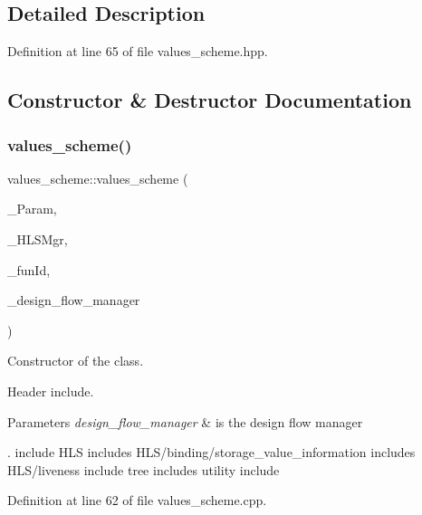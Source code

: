 \subsection{Detailed Description}


Definition at line 65 of file values\+\_\+scheme.\+hpp.



\subsection{Constructor \& Destructor Documentation}
\mbox{\label{classvalues__scheme_a056d10ea16901129e0a1a722b462b578}} 
\subsubsection{\texorpdfstring{values\+\_\+scheme()}{values\_scheme()}}
{\footnotesize\ttfamily values\+\_\+scheme\+::values\+\_\+scheme (\begin{DoxyParamCaption}\item[{const \hyperlink{Parameter_8hpp_a37841774a6fcb479b597fdf8955eb4ea}{Parameter\+Const\+Ref}}]{\+\_\+\+Param,  }\item[{const \hyperlink{hls__manager_8hpp_acd3842b8589fe52c08fc0b2fcc813bfe}{H\+L\+S\+\_\+manager\+Ref}}]{\+\_\+\+H\+L\+S\+Mgr,  }\item[{unsigned int}]{\+\_\+fun\+Id,  }\item[{const Design\+Flow\+Manager\+Const\+Ref}]{\+\_\+design\+\_\+flow\+\_\+manager }\end{DoxyParamCaption})}



Constructor of the class. 

Header include.


\begin{DoxyParams}{Parameters}
{\em design\+\_\+flow\+\_\+manager} & is the design flow manager\\
\hline
\end{DoxyParams}
. include H\+LS includes H\+L\+S/binding/storage\+\_\+value\+\_\+information includes H\+L\+S/liveness include tree includes utility include 

Definition at line 62 of file values\+\_\+scheme.\+cpp.



